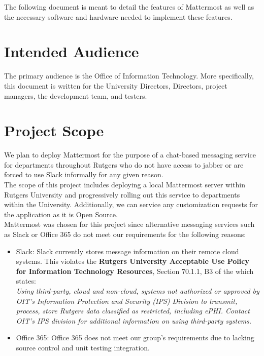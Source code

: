 \documentclass{scrreprt}
\begin{document}
The following document is meant to detail the features of Mattermost as well as
the necessary software and hardware needed to implement these features.

\section{Intended Audience}
The primary audience is the Office of Information Technology.  More
specifically, this document is written for the University Directors,
Directors, project managers, the development team, and testers.

\section{Project Scope}

We plan to deploy Mattermost for the purpose of a chat-based messaging
service for departments throughout Rutgers who do not have access to
jabber or are forced to use Slack informally for any given reason.\\

The scope of this project includes deploying a local Mattermost server within
Rutgers University and progressively rolling out this service to departments
within the University.  Additionally, we can service any customization requests
for the application as it is Open Source.\\

Mattermost was chosen for this project since alternative messaging services such
as Slack or Office 365 do not meet our requirements for the following reasons:
\begin{itemize}
  \item Slack: Slack currently stores message information on their remote
    cloud systems.  This violates the \textbf{Rutgers University Acceptable Use Policy for Information Technology Resources}, Section 70.1.1, B3 of the which states:\\
    \noindent
    \textit{Using third-party, cloud and non-cloud, systems not authorized or 
      approved by OIT’s Information Protection and Security (IPS) Division to 
      transmit, process, store Rutgers data classified as restricted, including 
      ePHI. Contact OIT’s IPS division for additional information on using 
      third-party systems.}
  \item Office 365: Office 365 does not meet our group's requirements due to
    lacking source control and unit testing integration.
\end{itemize}
\end{document}
